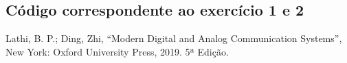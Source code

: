 \documentclass[a4paper,12pt,oneside,openany,table,xcdraw]{article}
\begin{document}
\subsection{Código correspondente ao exercício 1 e 2} \label{anexo:ex1}


%

\newpage
\begin{thebibliography}{9} 


    Lathi, B. P.; Ding, Zhi,
    “Modern Digital and Analog Communication Systems”, New York: 
    Oxford University Press, 2019. 5ª Edição.

\end{thebibliography}
\end{document}
